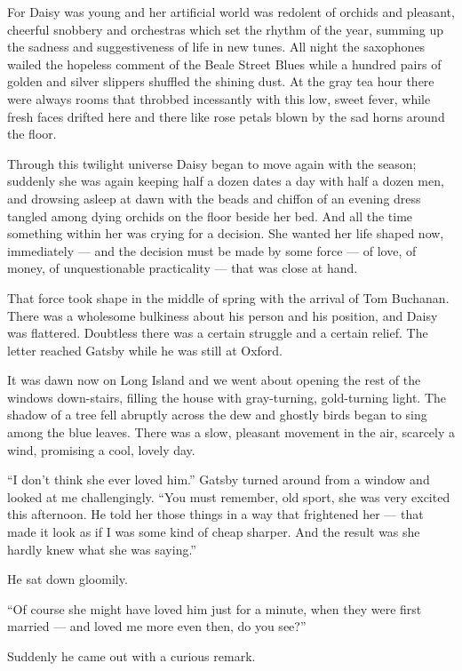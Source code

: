 \documentclass{znotebook}
\begin{document}
For Daisy was young and her artificial world was redolent of orchids and pleasant, cheerful snobbery and orchestras which set the rhythm of the year, summing up the sadness and suggestiveness of life in new tunes. All night the saxophones wailed the hopeless comment of the Beale Street Blues while a hundred pairs of golden and silver slippers shuffled the shining dust. At the gray tea hour there were always rooms that throbbed incessantly with this low, sweet fever, while fresh faces drifted here and there like rose petals blown by the sad horns around the floor.

Through this twilight universe Daisy began to move again with the season; suddenly she was again keeping half a dozen dates a day with half a dozen men, and drowsing asleep at dawn with the beads and chiffon of an evening dress tangled among dying orchids on the floor beside her bed. And all the time something within her was crying for a decision. She wanted her life shaped now, immediately ---{} and the decision must be made by some force ---{} of love, of money, of unquestionable practicality ---{} that was close at hand.

That force took shape in the middle of spring with the arrival of Tom Buchanan. There was a wholesome bulkiness about his person and his position, and Daisy was flattered. Doubtless there was a certain struggle and a certain relief. The letter reached Gatsby while he was still at Oxford.

It was dawn now on Long Island and we went about opening the rest of the windows down-stairs, filling the house with gray-turning, gold-turning light. The shadow of a tree fell abruptly across the dew and ghostly birds began to sing among the blue leaves. There was a slow, pleasant movement in the air, scarcely a wind, promising a cool, lovely day.

``I don't think she ever loved him.'' Gatsby turned around from a window and looked at me challengingly. ``You must remember, old sport, she was very excited this afternoon. He told her those things in a way that frightened her ---{} that made it look as if I was some kind of cheap sharper. And the result was she hardly knew what she was saying.''

He sat down gloomily.

``Of course she might have loved him just for a minute, when they were first married ---{} and loved me more even then, do you see?''

Suddenly he came out with a curious remark.
\end{document}
